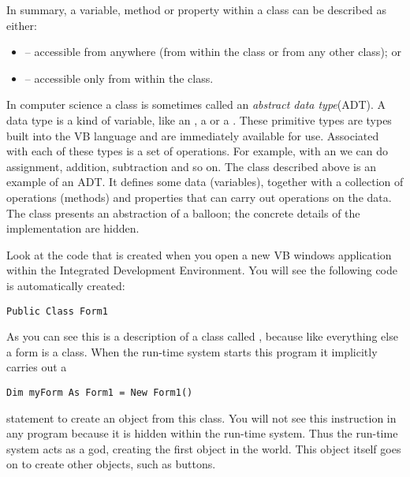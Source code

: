 		In summary, a variable, method or property within a class can be described as either:
		\begin{itemize}
      \item {} – accessible from anywhere (from within the class or from any other class); or
      \item {} – accessible only from within the class.
		\end{itemize}

		In computer science a class is sometimes called an \emph{abstract data type}(ADT). A data type is a kind of variable, like an , a  or a . These primitive types are types built into the VB language and are immediately available for use. Associated with each of these types is a set of operations. For example, with an  we can do assignment, addition, subtraction and so on. The  class described above is an example of an ADT. It defines some data (variables), together with a collection of operations (methods) and properties that can carry out operations on the data. The class presents an abstraction of a balloon; the concrete details of the implementation are hidden.
		
		Look at the code that is created when you open a new VB windows application within the Integrated Development Environment. You will see the following code is automatically created:
		\begin{lstlisting}
Public Class Form1
		\end{lstlisting}
		As you can see this is a description of a class called , because like everything else a form is a class. When the run-time system starts this program it implicitly carries out a
		\begin{lstlisting}
Dim myForm As Form1 = New Form1()
		\end{lstlisting}
		statement to create an object from this class. You will not see this instruction in any program because it is hidden within the run-time system. Thus the run-time system acts as a god, creating the first object in the world. This object itself goes on to create other objects, such as buttons.


